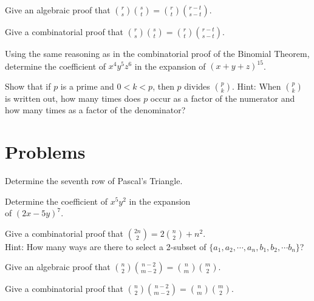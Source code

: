 \begin{exer}
Give an algebraic proof that $\displaystyle \binom{r}{s}\binom{s}{t} = \binom{r}{t}\binom{r-t}{s-t}$.
\end{exer}

\begin{exer}
Give a combinatorial proof that $\displaystyle \binom{r}{s}\binom{s}{t} = \binom{r}{t}\binom{r-t}{s-t}$.
\end{exer}

\begin{exer}
Using the same reasoning as in the combinatorial proof of the Binomial Theorem,
determine the coefficient of $x^4y^5z^6$ in the expansion of $(x+y+z)^{15}$.
\end{exer}

\begin{exer}
Show that if $p$ is a prime and $0< k<p$, then $p$ divides $\displaystyle {p\choose k}$.
Hint: When $\displaystyle {p\choose k}$ is written out, how many times does $p$ occur as a factor
of the numerator and how many times as a factor of the denominator?
\end{exer}

\section{Problems}

\begin{prob}
Determine the seventh row of Pascal's Triangle.
\end{prob}

\begin{prob}
Determine the coefficient of  $x^5y^2$ in the expansion\\ of $(2x-5y)^{7}$.
\end{prob}

\begin{prob}
Give a combinatorial  proof that $\displaystyle {{2n}\choose 2} = 2{n\choose 2} + n^2$.\\
Hint: How many ways are there to select a 2-subset of $\{a_1,a_2,\cdots,a_n,b_1,b_2,\cdots b_n\}$?
\end{prob}

\begin{prob}
Give an algebraic proof that $\displaystyle \binom{n}{2}\binom{n-2}{m-2} = \binom{n}{m}\binom{m}{2}$.
\end{prob}

\begin{prob}
Give a combinatorial proof that $\displaystyle \binom{n}{2}\binom{n-2}{m-2} = \binom{n}{m}\binom{m}{2}$.
\end{prob}

